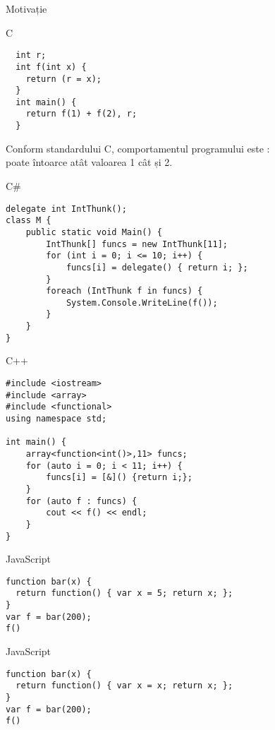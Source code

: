\documentclass[xcolor=pdftex,romanian,colorlinks]{beamer}
\begin{document}
\begin{section}{Motivație}
\begin{frame}[fragile]{C}

\begin{block}{}
\begin{verbatim}
  int r; 
  int f(int x) {
    return (r = x);
  }
  int main() {
    return f(1) + f(2), r;
  }
\end{verbatim}
\end{block}

 Conform standardului C, comportamentul programului este :\\
poate întoarce atât valoarea \alert{1} cât și \alert{2}.
\end{frame}

\begin{frame}[fragile]{C\#}
\begin{verbatim}
delegate int IntThunk();
class M {
    public static void Main() {
        IntThunk[] funcs = new IntThunk[11];
        for (int i = 0; i <= 10; i++) {
            funcs[i] = delegate() { return i; };
        }
        foreach (IntThunk f in funcs) {
            System.Console.WriteLine(f());
        }
    }
}
\end{verbatim}
\end{frame}


\begin{frame}[fragile]{C++}
\begin{verbatim}
#include <iostream>
#include <array>
#include <functional>
using namespace std;

int main() {
    array<function<int()>,11> funcs;
    for (auto i = 0; i < 11; i++) {
    	funcs[i] = [&]() {return i;};
    }
    for (auto f : funcs) {
    	cout << f() << endl;
    }
}
\end{verbatim}
\end{frame}

\begin{frame}[fragile]{JavaScript}
\begin{verbatim}
function bar(x) { 
  return function() { var x = 5; return x; }; 
}
var f = bar(200);
f()
\end{verbatim}
\end{frame}

\begin{frame}[fragile]{JavaScript}
\begin{verbatim}
function bar(x) { 
  return function() { var x = x; return x; }; 
}
var f = bar(200);
f()
\end{verbatim}
\end{frame}


\end{section}
\end{document}
